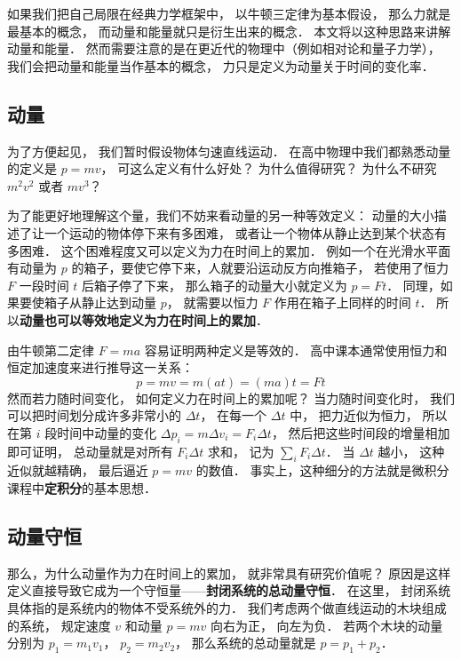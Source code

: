 

如果我们把自己局限在经典力学框架中， 以牛顿三定律为基本假设， 那么力就是最基本的概念， 而动量和能量就只是衍生出来的概念． 本文将以这种思路来讲解动量和能量． 然而需要注意的是在更近代的物理中（例如相对论和量子力学）， 我们会把动量和能量当作基本的概念， 力只是定义为动量关于时间的变化率．

\subsection{动量}
为了方便起见， 我们暂时假设物体匀速直线运动． 在高中物理中我们都熟悉动量的定义是 $p = mv$， 可这么定义有什么好处？ 为什么值得研究？ 为什么不研究 $m^2 v^2$ 或者 $mv^3$？

为了能更好地理解这个量，我们不妨来看动量的另一种等效定义： 动量的大小描述了让一个运动的物体停下来有多困难， 或者让一个物体从静止达到某个状态有多困难． 这个困难程度又可以定义为力在时间上的累加． 例如一个在光滑水平面有动量为 $p$ 的箱子，要使它停下来，人就要沿运动反方向推箱子， 若使用了恒力 $F$ 一段时间 $t$ 后箱子停了下来， 那么箱子的动量大小就定义为 $p = Ft$． 同理，如果要使箱子从静止达到动量 $p$， 就需要以恒力 $F$ 作用在箱子上同样的时间 $t$． 所以\textbf{动量也可以等效地定义为力在时间上的累加}．

由牛顿第二定律 $F = ma$ 容易证明两种定义是等效的． 高中课本通常使用恒力和恒定加速度来进行推导这一关系：
\begin{equation}
p = mv = m(at) = (ma)t = Ft
\end{equation}
然而若力随时间变化， 如何定义力在时间上的累加呢？ 当力随时间变化时， 我们可以把时间划分成许多非常小的 $\Delta t$， 在每一个 $\Delta t$ 中， 把力近似为恒力， 所以在第 $i$ 段时间中动量的变化 $\Delta p_i = m\Delta v_i = F_i\Delta t$， 然后把这些时间段的增量相加即可证明， 总动量就是对所有 $F_i\Delta t$ 求和， 记为 $\sum_i F_i \Delta t$． 当 $\Delta t$ 越小， 这种近似就越精确， 最后逼近 $p = mv$ 的数值． 事实上，这种细分的方法就是微积分课程中\textbf{定积分}的基本思想．

\subsection{动量守恒}
那么，为什么动量作为力在时间上的累加， 就非常具有研究价值呢？ 原因是这样定义直接导致它成为一个守恒量——\textbf{封闭系统的总动量守恒}． 在这里， 封闭系统具体指的是系统内的物体不受系统外的力． 我们考虑两个做直线运动的木块组成的系统， 规定速度 $v$ 和动量 $p = mv$ 向右为正， 向左为负． 若两个木块的动量分别为 $p_1 = m_1 v_1$， $p_2 = m_2 v_2$， 那么系统的总动量就是 $p = p_1 + p_2$．

